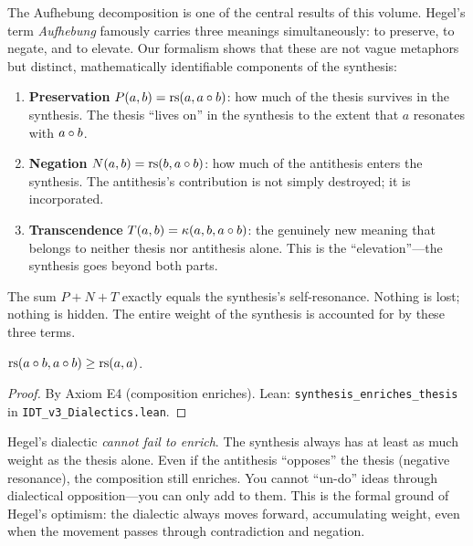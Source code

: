 \begin{interpretation}
\label{interp:aufhebung}
The Aufhebung decomposition is one of the central results of this volume.
Hegel's term \textit{Aufhebung} famously carries three meanings simultaneously:
to preserve, to negate, and to elevate. Our formalism shows that these are not
vague metaphors but distinct, mathematically identifiable components of the
synthesis:

\begin{enumerate}
\item \textbf{Preservation} $P(a,b) = \mathrm{rs}(a, a \circ b)$: how much of the
thesis survives in the synthesis. The thesis ``lives on'' in the synthesis to
the extent that $a$ resonates with $a \circ b$.

\item \textbf{Negation} $N(a,b) = \mathrm{rs}(b, a \circ b)$: how much of the
antithesis enters the synthesis. The antithesis's contribution is not simply
destroyed; it is incorporated.

\item \textbf{Transcendence} $T(a,b) = \kappa(a, b, a \circ b)$: the
genuinely new meaning that belongs to neither thesis nor antithesis alone.
This is the ``elevation''---the synthesis goes beyond both parts.
\end{enumerate}

The sum $P + N + T$ exactly equals the synthesis's self-resonance. Nothing
is lost; nothing is hidden. The entire weight of the synthesis is accounted
for by these three terms.
\end{interpretation}

\begin{theorem}
\label{thm:synthesis-enriches}
$\mathrm{rs}(a \circ b, a \circ b) \geq \mathrm{rs}(a, a)$.
\end{theorem}

\begin{proof}
By Axiom E4 (composition enriches).
Lean: \texttt{synthesis\_enriches\_thesis} in \texttt{IDT\_v3\_Dialectics.lean}.
\end{proof}

\begin{interpretation}
Hegel's dialectic \emph{cannot fail to enrich}. The synthesis always has at
least as much weight as the thesis alone. Even if the antithesis ``opposes''
the thesis (negative resonance), the composition still enriches. You cannot
``un-do'' ideas through dialectical opposition---you can only add to them.
This is the formal ground of Hegel's optimism: the dialectic always moves
forward, accumulating weight, even when the movement passes through
contradiction and negation.
\end{interpretation}

